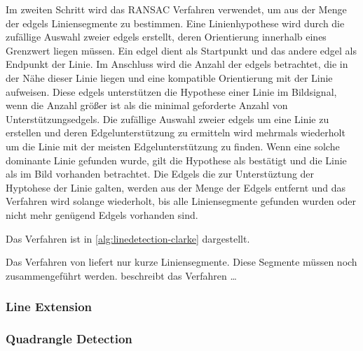 Im zweiten Schritt wird das RANSAC Verfahren verwendet, um aus der Menge der \gls{edgels} Liniensegmente zu bestimmen. Eine Linienhypothese wird durch die zufällige Auswahl zweier \gls{edgels} erstellt, deren Orientierung innerhalb eines Grenzwert liegen müssen. Ein edgel dient als Startpunkt und das andere edgel als Endpunkt der Linie. Im Anschluss wird die Anzahl der \gls{edgels} betrachtet, die in der Nähe dieser Linie liegen und eine kompatible Orientierung mit der Linie aufweisen. Diese \gls{edgels} unterstützen die Hypothese einer Linie im Bildsignal, wenn die Anzahl größer ist als die minimal geforderte Anzahl von Unterstützungsedgels. Die zufällige Auswahl zweier \gls{edgels} um eine Linie zu erstellen und deren Edgelunterstützung zu ermitteln wird mehrmals wiederholt um die Linie mit der meisten Edgelunterstützung zu finden. Wenn eine solche dominante Linie gefunden wurde, gilt die Hypothese als bestätigt und die Linie als im Bild vorhanden betrachtet. Die Edgels die zur Unterstüztung der Hyptohese der Linie galten, werden aus der Menge der Edgels entfernt und das Verfahren wird solange wiederholt, bis alle Liniensegmente gefunden wurden oder nicht mehr genügend Edgels vorhanden sind.

Das Verfahren ist in \autoref{alg:linedetection-clarke} dargestellt.



Das Verfahren von \citeauthor{clarke96} liefert nur kurze Liniensegmente. Diese Segmente müssen noch zusammengeführt werden. \citeauthor{hirzer08} beschreibt das Verfahren \dots

\subsubsection{Line Extension} %
\label{sub:line_extension}

\subsubsection{Quadrangle Detection} %
\label{sub:quadrangle_detection}

